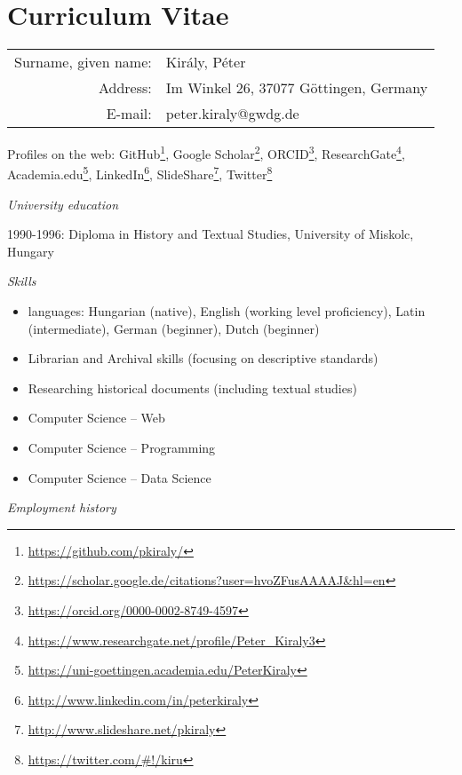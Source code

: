 \chapter{Curriculum Vitae}

\begin{table}[h]
\centering
\begin{tabular}{rl}
Surname, given name: & Király, Péter \\
Address:             & Im Winkel 26, 37077 Göttingen, Germany \\
E-mail:              & peter.kiraly@gwdg.de \\
\end{tabular}
\end{table}

Profiles on the web: GitHub\footnote{\url{https://github.com/pkiraly/}}, Google Scholar\footnote{\url{https://scholar.google.de/citations?user=hvoZFusAAAAJ&hl=en}}, ORCID\footnote{\url{https://orcid.org/0000-0002-8749-4597}}, ResearchGate\footnote{\url{https://www.researchgate.net/profile/Peter_Kiraly3}}, Academia.edu\footnote{\url{https://uni-goettingen.academia.edu/PeterKiraly}}, LinkedIn\footnote{\url{http://www.linkedin.com/in/peterkiraly}}, SlideShare\footnote{\url{http://www.slideshare.net/pkiraly}}, Twitter\footnote{\url{https://twitter.com/\#!/kiru}}

\emph{University education}

1990-1996:	Diploma in History and Textual Studies, University of Miskolc, Hungary

\emph{Skills}

\begin{itemize}
 \setlength{\parskip}{0pt}
 \setlength{\itemsep}{0pt plus 1pt}
\item languages: Hungarian (native), English (working level proficiency), Latin (intermediate), German (beginner), Dutch (beginner)
\item Librarian and Archival skills (focusing on descriptive standards)
\item Researching historical documents (including textual studies)
\item Computer Science -- Web
\item Computer Science -- Programming
\item Computer Science -- Data Science
\end{itemize}

\emph{Employment history}

